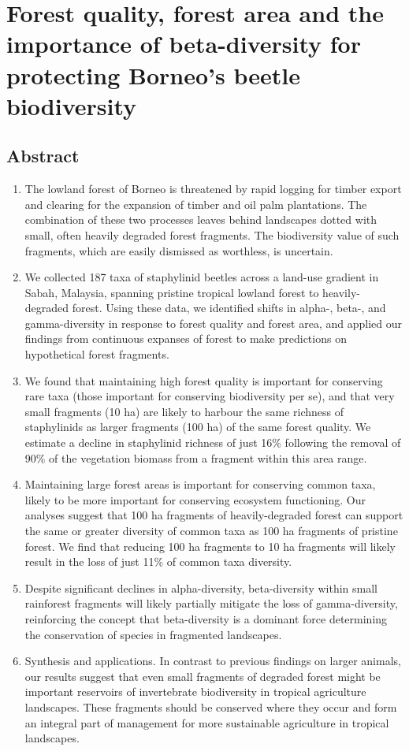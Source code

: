 \section*{Forest quality, forest area and the importance of beta-diversity for protecting Borneo's beetle biodiversity \citep{Sharp}}

\subsection*{Abstract}
\begin{enumerate}
	\item The lowland forest of Borneo is threatened by rapid logging for timber export and clearing for the expansion of timber and oil palm plantations. The combination of these two processes leaves behind landscapes dotted with small, often heavily degraded forest fragments. The biodiversity value of such fragments, which are easily dismissed as worthless, is uncertain.
	\item We collected 187 taxa of staphylinid beetles across a land-use gradient in Sabah, Malaysia, spanning pristine tropical lowland forest to heavily-degraded forest. Using these data, we identified shifts in alpha-, beta-, and gamma-diversity in response to forest quality and forest area, and applied our findings from continuous expanses of forest to make predictions on hypothetical forest fragments.
	\item We found that maintaining high forest quality is important for conserving rare taxa (those important for conserving biodiversity per se), and that very small fragments (10 ha) are likely to harbour the same richness of staphylinids as larger fragments (100 ha) of the same forest quality. We estimate a decline in staphylinid richness of just 16\% following the removal of 90\% of the vegetation biomass from a fragment within this area range.
	\item Maintaining large forest areas is important for conserving common taxa, likely to be more important for conserving ecosystem functioning. Our analyses suggest that 100 ha fragments of heavily-degraded forest can support the same or greater diversity of common taxa as 100 ha fragments of pristine forest. We find that reducing 100 ha fragments to 10 ha fragments will likely result in the loss of just 11\% of common taxa diversity.
	\item Despite significant declines in alpha-diversity, beta-diversity within small rainforest fragments will likely partially mitigate the loss of gamma-diversity, reinforcing the concept that beta-diversity is a dominant force determining the conservation of species in fragmented landscapes.
	\item Synthesis and applications. In contrast to previous findings on larger animals, our results suggest that even small fragments of degraded forest might be important reservoirs of invertebrate biodiversity in tropical agriculture landscapes. These fragments should be conserved where they occur and form an integral part of management for more sustainable agriculture in tropical landscapes.
\end{enumerate}


